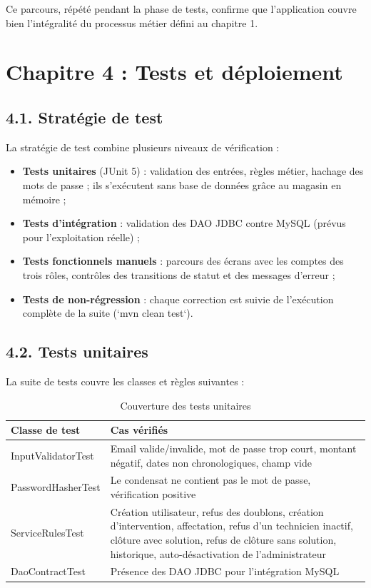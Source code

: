 \documentclass[11pt,a4paper]{report}
\begin{document}
Ce parcours, répété pendant la phase de tests, confirme que l'application couvre bien l'intégralité du processus métier défini au chapitre 1.
\chapter*{Chapitre 4 : Tests et déploiement}
\section*{4.1. Stratégie de test}

La stratégie de test combine plusieurs niveaux de vérification :
\begin{itemize}
  \item \textbf{Tests unitaires} (JUnit 5) : validation des entrées, règles métier, hachage des mots de passe ; ils s'exécutent sans base de données grâce au magasin en mémoire ;
  \item \textbf{Tests d'intégration} : validation des DAO JDBC contre MySQL (prévus pour l'exploitation réelle) ;
  \item \textbf{Tests fonctionnels manuels} : parcours des écrans avec les comptes des trois rôles, contrôles des transitions de statut et des messages d'erreur ;
  \item \textbf{Tests de non-régression} : chaque correction est suivie de l'exécution complète de la suite (`mvn clean test`).
\end{itemize}
\section*{4.2. Tests unitaires}

La suite de tests couvre les classes et règles suivantes :
\begin{table}[htbp]\centering\small
\begin{tabularx}{\textwidth}{|p{3.8cm}|X|}
\hline\rowcolor{hdr}\textbf{Classe de test} & \textbf{Cas vérifiés}\\ \hline
InputValidatorTest & Email valide/invalide, mot de passe trop court, montant négatif, dates non chronologiques, champ vide\\ \hline
PasswordHasherTest & Le condensat ne contient pas le mot de passe, vérification positive\\ \hline
ServiceRulesTest & Création utilisateur, refus des doublons, création d'intervention, affectation, refus d'un technicien inactif, clôture avec solution, refus de clôture sans solution, historique, auto-désactivation de l'administrateur\\ \hline
DaoContractTest & Présence des DAO JDBC pour l'intégration MySQL\\ \hline
\end{tabularx}
\caption{Couverture des tests unitaires}
\end{table}
\end{document}
